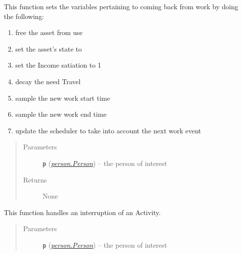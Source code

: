 \documentclass[letterpaper,10pt,english]{sphinxmanual}
\begin{document}
\begin{fulllineitems}
\begin{fulllineitems}
\end{fulllineitems}


\begin{fulllineitems}
\label{work:work.Work.end_work}
This function sets the variables pertaining to coming back from work by doing the following:
\begin{enumerate}
\item {} 
free the asset from use

\item {} 
set the asset's state to 

\item {} 
set the Income satiation to 1

\item {} 
decay the need Travel

\item {} 
sample the new work start time

\item {} 
sample the new work end time

\item {} 
update the scheduler to take into account the next work event

\end{enumerate}
\begin{quote}\begin{description}
\item[{Parameters}] \leavevmode
\textbf{\texttt{p}} ({\hyperref[person:person.Person]{\emph{\emph{person.Person}}}}) -- the person of interest

\item[{Returns}] \leavevmode
None

\end{description}\end{quote}

\end{fulllineitems}


\begin{fulllineitems}
\label{work:work.Work.halt}
This function handles an interruption of an Activity.
\begin{quote}\begin{description}
\item[{Parameters}] \leavevmode
\textbf{\texttt{p}} ({\hyperref[person:person.Person]{\emph{\emph{person.Person}}}}) -- the person of interest


\end{description}
\end{quote}
\end{fulllineitems}
\end{fulllineitems}
\end{document}
